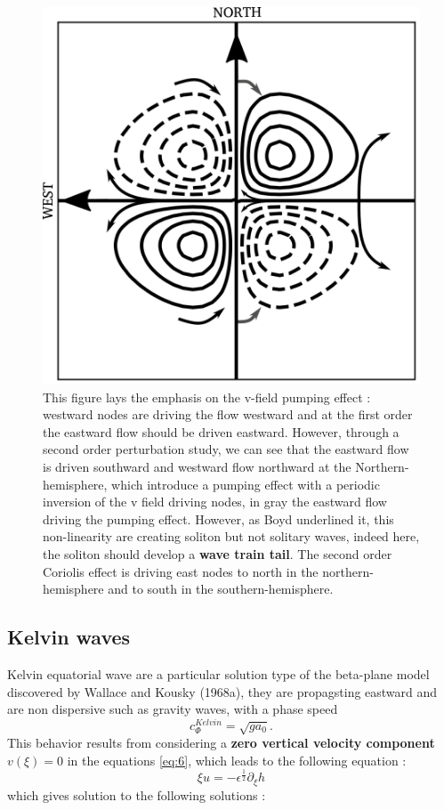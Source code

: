 \documentclass[11pt,a4paper]{report}
\begin{document}
\begin{multicols}{2}
    \begin{figure}[H]
        \centering
        \includegraphics[width=.8\linewidth]{./figure/pump.png}
        \vspace*{.5cm}
        \caption{\footnotesize{This figure lays the emphasis on the v-field pumping effect : westward nodes are driving the flow westward and at the first order the eastward flow should be driven eastward. However, through a second order perturbation study, we can see that the eastward flow is driven southward and westward flow northward at the Northern-hemisphere,
                which introduce a pumping effect with a periodic inversion of the v field driving nodes, in gray the eastward flow driving the pumping effect. However,  as Boyd underlined it, this non-linearity are creating soliton but not solitary waves, indeed here, the soliton should develop a \textbf{wave train tail}. The second order Coriolis effect is driving east nodes to north in the northern-hemisphere and to south in the southern-hemisphere.}}
        \label{fig:vfield Rossby}

    \end{figure}

    \subsection{Kelvin waves}
    Kelvin equatorial wave are a particular solution type of the beta-plane model discovered by Wallace and Kousky (1968a), they are propagsting eastward and are non dispersive such as gravity waves, with a phase speed $$c_\Phi^{Kelvin} = \sqrt{ga_0}.$$ This behavior results from considering a \textbf{zero vertical velocity component} $v(\xi) = 0$ in the equations \ref{eq:6}, which leads to the following equation :
    $$\xi u =- \epsilon^{\frac{1}{2}}\partial_\xi h$$
    which gives solution to the following solutions\cite{Holton} :


\end{multicols}
\end{document}
